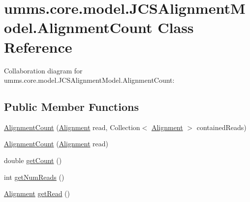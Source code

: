 \hypertarget{classumms_1_1core_1_1model_1_1_j_c_s_alignment_model_1_1_alignment_count}{\section{umms.\+core.\+model.\+J\+C\+S\+Alignment\+Model.\+Alignment\+Count Class Reference}
\label{classumms_1_1core_1_1model_1_1_j_c_s_alignment_model_1_1_alignment_count}
}


Collaboration diagram for umms.\+core.\+model.\+J\+C\+S\+Alignment\+Model.\+Alignment\+Count\+:
\subsection*{Public Member Functions}
\begin{DoxyCompactItemize}
\item 
\hyperlink{classumms_1_1core_1_1model_1_1_j_c_s_alignment_model_1_1_alignment_count_af8359e3b1cc9bd229e31166ad906d94e}{Alignment\+Count} (\hyperlink{interfaceumms_1_1core_1_1alignment_1_1_alignment}{Alignment} read, Collection$<$ \hyperlink{interfaceumms_1_1core_1_1alignment_1_1_alignment}{Alignment} $>$ contained\+Reads)
\item 
\hyperlink{classumms_1_1core_1_1model_1_1_j_c_s_alignment_model_1_1_alignment_count_a7843d77356a982b1f127495005312f64}{Alignment\+Count} (\hyperlink{interfaceumms_1_1core_1_1alignment_1_1_alignment}{Alignment} read)
\item 
double \hyperlink{classumms_1_1core_1_1model_1_1_j_c_s_alignment_model_1_1_alignment_count_a137f96ea81cbd7772c852627844ea01a}{get\+Count} ()
\item 
int \hyperlink{classumms_1_1core_1_1model_1_1_j_c_s_alignment_model_1_1_alignment_count_a968c72b34a071fb004304deb0b9c4410}{get\+Num\+Reads} ()
\item 
\hyperlink{interfaceumms_1_1core_1_1alignment_1_1_alignment}{Alignment} \hyperlink{classumms_1_1core_1_1model_1_1_j_c_s_alignment_model_1_1_alignment_count_a1a5d47398fa623367619763af8bdcf6c}{get\+Read} ()
\end{DoxyCompactItemize}


